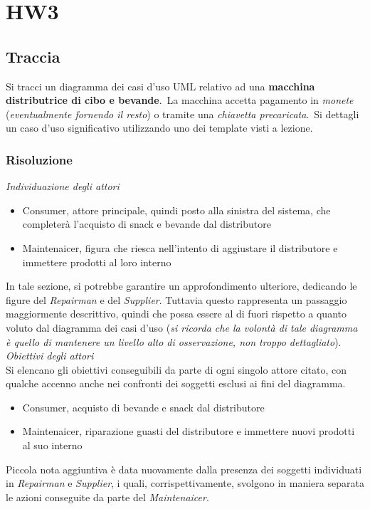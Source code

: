 \documentclass{article}
\begin{document}
\pagestyle{empty}

\section*{HW3}
\large

\subsection*{Traccia}
\large
Si tracci un diagramma dei casi d’uso UML relativo ad una \textbf{macchina distributrice di cibo e bevande}.\ La macchina accetta pagamento in \textit{monete} (\textit{eventualmente fornendo il resto}) o tramite una \textit{chiavetta precaricata}.\ Si dettagli un caso d’uso significativo utilizzando uno dei template visti a lezione.

\subsubsection*{Risoluzione}
\large
\textit{Individuazione degli attori}
\begin{itemize}[label={-}]
    \item Consumer, attore principale, quindi posto alla sinistra del sistema, che completerà l'acquisto di snack e bevande dal distributore
    \item Maintenaicer, figura che riesca nell'intento di aggiustare il distributore e immettere prodotti al loro interno
\end{itemize}
In tale sezione, si potrebbe garantire un approfondimento ulteriore, dedicando le figure del \textit{Repairman} e del \textit{Supplier}. Tuttavia questo rappresenta un passaggio maggiormente descrittivo, quindi che possa essere al di fuori rispetto a quanto voluto dal diagramma dei casi d'uso (\textit{si ricorda che la volontà di tale diagramma è quello di mantenere un livello alto di osservazione, non troppo dettagliato}).\vspace{14pt}\\
\textit{Obiettivi degli attori}\\
Si elencano gli obiettivi conseguibili da parte di ogni singolo attore citato, con qualche accenno anche nei confronti dei soggetti esclusi ai fini del diagramma.
\begin{itemize}[label={-}]
    \item Consumer, acquisto di bevande e snack dal distributore
    \item Maintenaicer, riparazione guasti del distributore e immettere nuovi prodotti al suo interno
\end{itemize}
Piccola nota aggiuntiva è data nuovamente dalla presenza dei soggetti individuati in \textit{Repairman} e \textit{Supplier}, i quali, corrispettivamente, svolgono in maniera separata le azioni conseguite da parte del \textit{Maintenaicer}.
\end{document}

